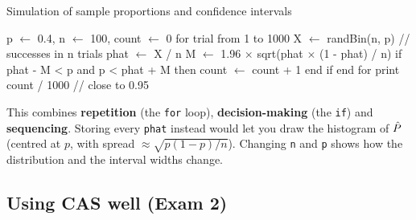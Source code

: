 \begin{keyres}{Simulation of sample proportions and confidence intervals}
\label{sec:pseudo-sim}
\begin{cols}[0.56]
\begin{pseudo}
p $\gets$ 0.4,  n $\gets$ 100,  count $\gets$ 0
for trial from 1 to 1000
    X $\gets$ randBin(n, p)        // successes in n trials
    phat $\gets$ X / n
    M $\gets$ 1.96 $\times$ sqrt(phat $\times$ (1 - phat) / n)
    if phat - M < p and p < phat + M then
        count $\gets$ count + 1
    end if
end for
print count / 1000                 // close to 0.95
\end{pseudo}
\nextcol[0.415]
This combines \textbf{repetition} (the \texttt{for} loop), \textbf{decision-making} (the \texttt{if}) and \textbf{sequencing}. Storing every \texttt{phat} instead would let you draw the histogram of $\hat{P}$ (centred at $p$, with spread $\approx\sqrt{p(1-p)/n}$). Changing \texttt{n} and \texttt{p} shows how the distribution and the interval widths change.
\end{cols}
\end{keyres}

\needspace{0.42\textheight}
\subsection{Using CAS well (Exam 2)}
\label{sec:cas}

